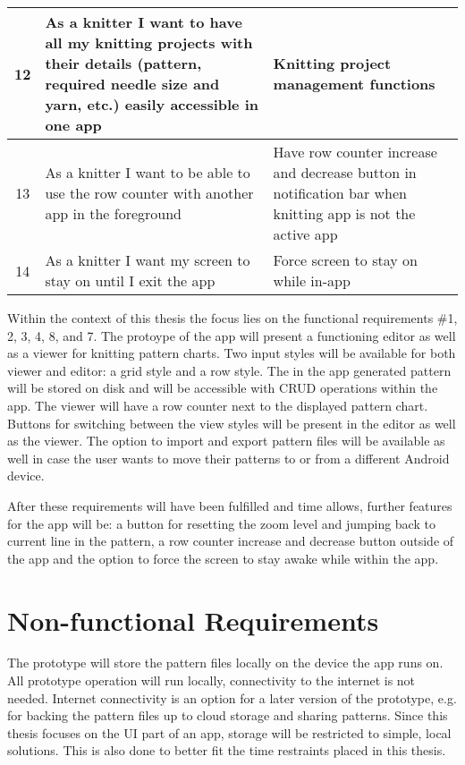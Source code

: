\begin{longtable}{| c | p{6.5cm} | p{6.5cm} |}
	12 & As a knitter I want to have all my knitting projects with their details (pattern, required needle size and yarn, etc.) easily accessible in one app & Knitting project management functions  \\ \hline
	13 & As a knitter I want to be able to use the row counter with another app in the foreground &  Have row counter increase and decrease button in notification bar when knitting app is not the active app \\ \hline
	14 & As a knitter I want my screen to stay on until I exit the app & Force screen to stay on while in-app \\ \hline
\end{longtable}

Within the context of this thesis the focus lies on the functional requirements \#1, 2, 3, 4, 8, and 7. The protoype of the app will present a functioning editor as well as a viewer for knitting pattern charts. Two input styles will be available for both viewer and editor: a grid style and a row style. The in the app generated pattern will be stored on disk and will be accessible with CRUD operations within the app. The viewer will have a row counter next to the displayed pattern chart. Buttons for switching between the view styles will be present in the editor as well as the viewer. The option to import and export pattern files will be available as well in case the user wants to move their patterns to or from a different Android device. 

After these requirements will have been fulfilled and time allows, further features for the app will be: a button for resetting the zoom level and jumping back to current line in the pattern, a row counter increase and decrease button outside of the app and the option to force the screen to stay awake while within the app.

\section{Non-functional Requirements}

The prototype will store the pattern files locally on the device the app runs on. All prototype operation will run locally, connectivity to the internet is not needed. Internet connectivity is an option for a later version of the prototype, e.g. for backing the pattern files up to cloud storage and sharing patterns. Since this thesis focuses on the \gls{UI} part of an app, storage will be restricted to simple, local solutions. This is also done to better fit the time restraints placed in this thesis.